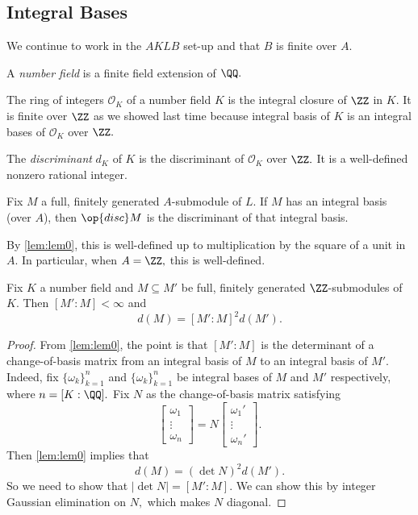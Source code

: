 \subsection{Integral Bases}
We continue to work in the $AKLB$ set-up and that $B$ is finite over $A.$
\begin{defi}
    A \textit{number field} is a finite field extension of $\QQ.$
\end{defi}
\begin{defi}
    The ring of integers $\mathcal O_K$ of a number field $K$ is the integral closure of $\ZZ$ in $K.$ It is finite over $\ZZ$ as we showed last time because integral basis of $K$ is an integral bases of $\mathcal O_K$ over $\ZZ.$
\end{defi}
\begin{defi}[Discriminant]
    The \textit{discriminant} $d_K$ of $K$ is the discriminant of $\mathcal O_K$ over $\ZZ.$ It is a well-defined nonzero rational integer.
\end{defi}
\begin{defi}
    Fix $M$ a full, finitely generated $A$-submodule of $L.$ If $M$ has an integral basis (over $A$), then $\op{disc}M$ is the discriminant of that integral basis.
\end{defi}
\begin{remark}
    By \autoref{lem:lem0}, this is well-defined up to multiplication by the square of a unit in $A.$ In particular, when $A=\ZZ,$ this is well-defined.
\end{remark}
\begin{prop} \label{prop:212}
    Fix $K$ a number field and $M\subseteq M'$ be full, finitely generated $\ZZ$-submodules of $K.$ Then $[M':M]<\infty$ and
    \[d(M)=[M':M]^2d(M').\]
\end{prop}
\begin{proof}
    From \autoref{lem:lem0}, the point is that $[M':M]$ is the determinant of a change-of-basis matrix from an integral basis of $M$ to an integral basis of $M'.$ Indeed, fix $\{\omega_k\}_{k=1}^n$ and $\{\omega_k\}_{k=1}^n$ be integral bases of $M$ and $M'$ respectively, where $n=[K:\QQ].$ Fix $N$ as the change-of-basis matrix satisfying
    \[\begin{bmatrix}\omega_1 \\ \vdots \\ \omega_n\end{bmatrix}=N\begin{bmatrix}\omega_1' \\ \vdots \\ \omega_n'\end{bmatrix}.\]
    Then \autoref{lem:lem0} implies that
    \[d(M)=(\det N)^2d(M').\]
    So we need to show that $|\det N|=[M':M].$ We can show this by integer Gaussian elimination on $N,$ which makes $N$ diagonal. 
\end{proof}
